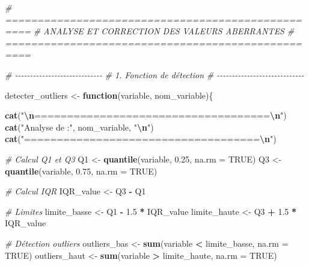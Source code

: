 \documentclass[
]{article}
\newenvironment{Shaded}{\begin{snugshade}}{\end{snugshade}}
\newcommand{\AttributeTok}[1]{\textcolor[rgb]{0.13,0.29,0.53}{#1}}
\newcommand{\CommentTok}[1]{\textcolor[rgb]{0.56,0.35,0.01}{\textit{#1}}}
\newcommand{\ConstantTok}[1]{\textcolor[rgb]{0.56,0.35,0.01}{#1}}
\newcommand{\ControlFlowTok}[1]{\textcolor[rgb]{0.13,0.29,0.53}{\textbf{#1}}}
\newcommand{\FloatTok}[1]{\textcolor[rgb]{0.00,0.00,0.81}{#1}}
\newcommand{\FunctionTok}[1]{\textcolor[rgb]{0.13,0.29,0.53}{\textbf{#1}}}
\newcommand{\NormalTok}[1]{#1}
\newcommand{\OtherTok}[1]{\textcolor[rgb]{0.56,0.35,0.01}{#1}}
\newcommand{\SpecialCharTok}[1]{\textcolor[rgb]{0.81,0.36,0.00}{\textbf{#1}}}
\newcommand{\StringTok}[1]{\textcolor[rgb]{0.31,0.60,0.02}{#1}}
\begin{document}
\begin{Shaded}
\begin{Highlighting}[]
\CommentTok{\# ==================================================}
\CommentTok{\# ANALYSE ET CORRECTION DES VALEURS ABERRANTES}
\CommentTok{\# ==================================================}

\CommentTok{\# {-}{-}{-}{-}{-}{-}{-}{-}{-}{-}{-}{-}{-}{-}{-}{-}{-}{-}{-}{-}{-}{-}{-}{-}{-}{-}{-}{-}{-}}
\CommentTok{\# 1. Fonction de détection}
\CommentTok{\# {-}{-}{-}{-}{-}{-}{-}{-}{-}{-}{-}{-}{-}{-}{-}{-}{-}{-}{-}{-}{-}{-}{-}{-}{-}{-}{-}{-}{-}}

\NormalTok{detecter\_outliers }\OtherTok{\textless{}{-}} \ControlFlowTok{function}\NormalTok{(variable, nom\_variable)\{}

\FunctionTok{cat}\NormalTok{(}\StringTok{"}\SpecialCharTok{\textbackslash{}n}\StringTok{====================================}\SpecialCharTok{\textbackslash{}n}\StringTok{"}\NormalTok{)}
\FunctionTok{cat}\NormalTok{(}\StringTok{"Analyse de :"}\NormalTok{, nom\_variable, }\StringTok{"}\SpecialCharTok{\textbackslash{}n}\StringTok{"}\NormalTok{)}
\FunctionTok{cat}\NormalTok{(}\StringTok{"====================================}\SpecialCharTok{\textbackslash{}n}\StringTok{"}\NormalTok{)}

\CommentTok{\# Calcul Q1 et Q3}
\NormalTok{Q1 }\OtherTok{\textless{}{-}} \FunctionTok{quantile}\NormalTok{(variable, }\FloatTok{0.25}\NormalTok{, }\AttributeTok{na.rm =} \ConstantTok{TRUE}\NormalTok{)}
\NormalTok{Q3 }\OtherTok{\textless{}{-}} \FunctionTok{quantile}\NormalTok{(variable, }\FloatTok{0.75}\NormalTok{, }\AttributeTok{na.rm =} \ConstantTok{TRUE}\NormalTok{)}

\CommentTok{\# Calcul IQR}
\NormalTok{IQR\_value }\OtherTok{\textless{}{-}}\NormalTok{ Q3 }\SpecialCharTok{{-}}\NormalTok{ Q1}

\CommentTok{\# Limites}
\NormalTok{limite\_basse }\OtherTok{\textless{}{-}}\NormalTok{ Q1 }\SpecialCharTok{{-}} \FloatTok{1.5} \SpecialCharTok{*}\NormalTok{ IQR\_value}
\NormalTok{limite\_haute }\OtherTok{\textless{}{-}}\NormalTok{ Q3 }\SpecialCharTok{+} \FloatTok{1.5} \SpecialCharTok{*}\NormalTok{ IQR\_value}

\CommentTok{\# Détection outliers}
\NormalTok{outliers\_bas }\OtherTok{\textless{}{-}} \FunctionTok{sum}\NormalTok{(variable }\SpecialCharTok{\textless{}}\NormalTok{ limite\_basse, }\AttributeTok{na.rm =} \ConstantTok{TRUE}\NormalTok{)}
\NormalTok{outliers\_haut }\OtherTok{\textless{}{-}} \FunctionTok{sum}\NormalTok{(variable }\SpecialCharTok{\textgreater{}}\NormalTok{ limite\_haute, }\AttributeTok{na.rm =} \ConstantTok{TRUE}\NormalTok{)}


\end{Highlighting}
\end{Shaded}
\end{document}
